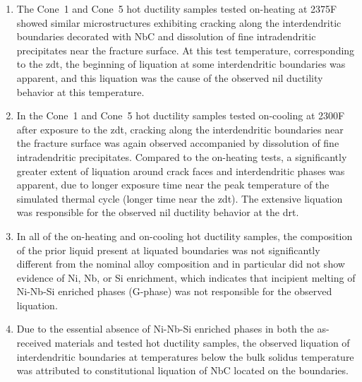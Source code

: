 \begin{enumerate}
\item The Cone~1 and Cone~5 hot ductility samples tested on-heating at 2375\textdegree{}F showed similar microstructures exhibiting cracking along the interdendritic boundaries decorated with NbC and dissolution of fine intradendritic precipitates near the fracture surface. At this test temperature, corresponding to the \gls{zdt}, the beginning of liquation at some interdendritic boundaries was apparent, and this liquation was the cause of the observed nil ductility behavior at this temperature.
\item In the Cone~1 and Cone~5 hot ductility samples tested on-cooling at 2300\textdegree{}F after exposure to the \gls{zdt}, cracking along the interdendritic boundaries near the fracture surface was again observed accompanied by dissolution of fine intradendritic precipitates. Compared to the on-heating tests, a significantly greater extent of liquation around crack faces and interdendritic phases was apparent, due to longer exposure time near the peak temperature of the simulated thermal cycle (longer time near the \gls{zdt}). The extensive liquation was responsible for the observed nil ductility behavior at the \gls{drt}.
\item In all of the on-heating and on-cooling hot ductility samples, the composition of the prior liquid present at liquated boundaries was not significantly different from the nominal alloy composition and in particular did not show evidence of Ni, Nb, or Si enrichment, which indicates that incipient melting of Ni-Nb-Si enriched phases (G-phase) was not responsible for the observed liquation.
\item Due to the essential absence of Ni-Nb-Si enriched phases in both the as-received materials and tested hot ductility samples, the observed liquation of interdendritic boundaries at temperatures below the bulk solidus temperature was attributed to constitutional liquation of NbC located on the boundaries.

\end{enumerate}


